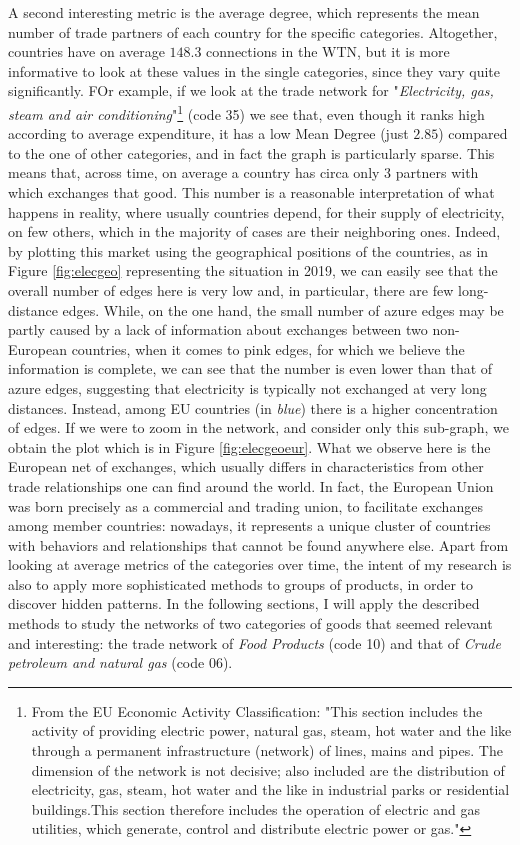 A second interesting metric is the average degree, which represents the mean number of trade partners of each country for the specific categories. Altogether, countries have on average $148.3$ connections in the WTN, but it is more informative to look at these values in the single categories, since they vary quite significantly. FOr example, if we look at the trade network for "\textit{Electricity, gas, steam and air conditioning}"\footnote{
    From the EU Economic Activity Classification:
    "This section includes the activity of providing electric power, natural gas, steam, hot water and the like through a permanent infrastructure (network) of lines, mains and pipes. The dimension of the network is not decisive; also included are the distribution of electricity, gas, steam, hot water and the like in industrial parks or residential buildings.This section therefore includes the operation of electric and gas utilities, which generate, control and distribute electric power or gas."\cite{eurostat2022website}
} (code 35) we see that, even though it ranks high according to average expenditure, it has a low Mean Degree (just $2.85$) compared to the one of other categories, and in fact the graph is particularly sparse. This means that, across time, on average a country has circa only 3 partners with which exchanges that good. This number is a reasonable interpretation of what happens in reality, where usually countries depend, for their supply of electricity, on few others, which in the majority of cases are their neighboring ones. Indeed, by plotting this market using the geographical positions of the countries, as in Figure \ref{fig:elecgeo} representing the situation in 2019, we can easily see that the overall number of edges here is very low and, in particular, there are few long-distance edges. While, on the one hand, the small number of azure edges may be partly caused by a lack of information about exchanges between two non-European countries, when it comes to pink edges, for which we believe the information is complete, we can see that the number is even lower than that of azure edges, suggesting that electricity is typically not exchanged at very long distances. Instead, among EU countries (in \textit{blue}) there is a higher concentration of edges. If we were to zoom in the network, and consider only this sub-graph, we obtain the plot which is in Figure \ref{fig:elecgeoeur}. What we observe here is the European net of exchanges, which usually differs in characteristics from other trade relationships one can find around the world. In fact, the European Union was born precisely as a commercial and trading union, to facilitate exchanges among member countries: nowadays, it represents a unique cluster of countries with behaviors and relationships that cannot be found anywhere else.
Apart from looking at average metrics of the categories over time, the intent of my research is also to apply more sophisticated methods to groups of products, in order to discover hidden patterns. In the following sections, I will apply the described methods to study the networks of two categories of goods that seemed relevant and interesting: the trade network of \textit{Food Products} (code 10) and that of \textit{Crude petroleum and natural gas} (code 06).\pagebreak

